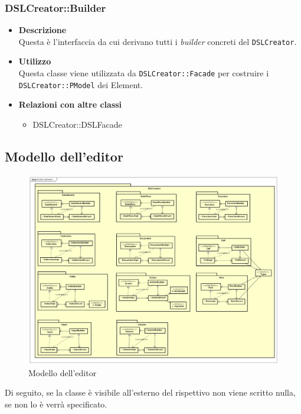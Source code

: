         \subsubsection{DSLCreator::Builder}
        \begin{itemize}
        \item \textbf{Descrizione} \hfill \\
          Questa è l'interfaccia da cui derivano tutti i \textit{builder} concreti del  \texttt{DSLCreator}.
        \item \textbf{Utilizzo}  \hfill \\
          Questa classe viene utilizzata da \texttt{DSLCreator::Facade} per costruire i \texttt{DSLCreator::PModel} dei  Element.
        \item \textbf{Relazioni con altre classi} \hfill 
          \begin{itemize}
          \item DSLCreator::DSLFacade
          \end{itemize}
        \end{itemize}

        \subsection{Modello dell'editor}
        \begin{figure}[H]
          \centering
          \includegraphics[width=1.1\textwidth]{res/img/Diagram_Model.png}
          \caption{Modello dell'editor}
          \label{fig:diagram_model}
        \end{figure}
        Di seguito, se la classe è visibile all'esterno del rispettivo  non viene scritto nulla, se non lo è verrà specificato.
